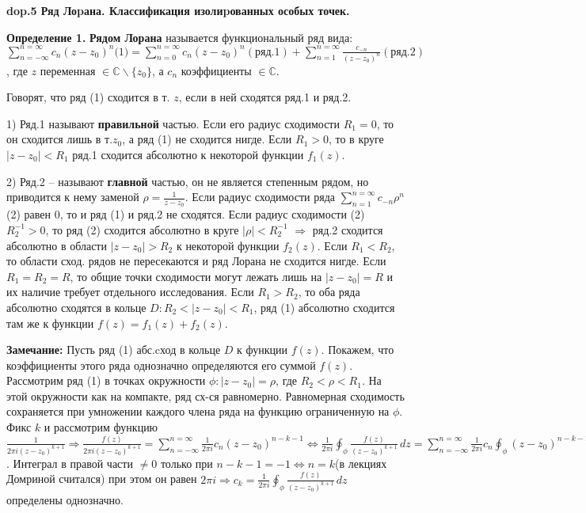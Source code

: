 \textbf{\LARGE dop.5 Ряд Лоpана. Классификация изолиpованных особых точек.}

\textbf{Определение 1.}
\textbf{Рядом Лорана} называется функциональный ряд вида: $\sum_{n=-\infty}^{n=\infty}c_n(z-z_0)^n\text{(1)} = \sum_{n=0}^{n=\infty}c_n(z-z_0)^n(\text{ряд.1}) +  \sum_{n=1}^{n=\infty}\frac{c_{-n}}{(z-z_0)^n}(\text{ряд.2})$, где $z$ переменная $\in \mathbb{C}\backslash\{z_0\}$, а $c_n$ коэффициенты $\in \mathbb{C}$.


\noindent Говорят, что ряд (1) сходится в т. $z$, если в ней сходятся ряд.1 и ряд.2.

    1) Ряд.1 называют \textbf{правильной} частью. Если его радиус сходимости $R_1=0$, то он сходится лишь в т.$z_0$, а ряд (1) не сходится нигде. Если $R_1>0$, то в круге $|z-z_0|<R_1$ ряд.1 сходится абсолютно к некоторой функции $f_1(z)$.
    
    2) Ряд.2 -- называют \textbf{главной} частью, он не является степенным рядом, но приводится к нему заменой $\rho = \frac{1}{z-z_0}$. Если радиус сходимости ряда $\sum_{n=1}^{n=\infty}c_{-n}\rho^n$(2) равен 0, то и ряд (1) и ряд.2 не сходятся. Если радиус сходимости (2) $R^{-1}_2 > 0$, то ряд (2) сходится абсолютно в круге $|\rho|<R^{-1}_2$ $\Rightarrow$ ряд.2 сходится абсолютно в области $|z-z_0|>R_2$  к некоторой функции $f_2(z)$. Если $R_1<R_2$, то области сход. рядов не пересекаются и ряд Лорана не сходится нигде. Если $R_1=R_2=R$, то общие точки сходимости могут лежать лишь на $|z-z_0|=R$ и их наличие требует отдельного исследования. Если $R_1>R_2$, то оба ряда абсолютно сходятся в кольце $D: R_2<|z-z_0|<R_1$, ряд (1) абсолютно сходится там же к функции $f(z) = f_1(z)+f_2(z)$.

\textbf{Замечание:} Пусть ряд (1) абс.cход в кольце $D$ к функции $f(z)$. Покажем, что коэффициенты этого ряда однозначно определяются его суммой $f(z)$. Рассмотрим ряд (1) в точках окружности $\phi: |z-z_0|=\rho$, где $R_2<\rho<R_1$. На этой окружности как на компакте, ряд сх-ся равномерно. Равномерная сходимость сохраняется при умножении каждого члена ряда на функцию ограниченную на $\phi$. Фикс $k$ и рассмотрим функцию $\frac{1}{2\pi i(z-z_0)^{k+1}} \Rightarrow \frac{f(z)}{2\pi i(z-z_0)^{k+1}} = \sum_{n=-\infty}^{n=\infty}\frac{1}{2\pi i}c_n(z-z_0)^{n-k-1} \Longleftrightarrow \frac{1}{2\pi i} \oint_\phi \frac{f(z)}{(z-z_0)^{k+1}} \,dz = \sum_{n=-\infty}^{n=\infty}\frac{1}{2\pi i}c_n\oint_\phi(z-z_0)^{n-k-1} \,dz$. Интеграл в правой части $\neq0$ только при $n-k-1=-1 \Longleftrightarrow n=k$(в лекциях Домриной считался) при этом он равен $2\pi i \Rightarrow c_k = \frac{1}{2\pi i} \oint_\phi \frac{f(z)}{(z-z_0)^{k+1}} \,dz$ определены однозначно.

